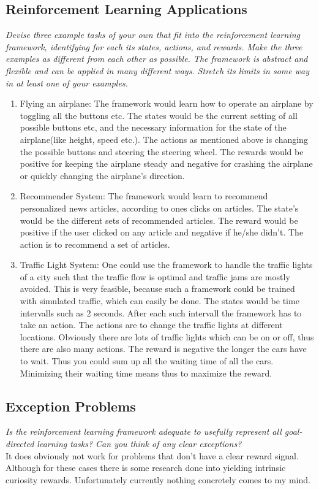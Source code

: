 \documentclass[12pt,a4paper]{article}
\begin{document}
\subsection{Reinforcement Learning Applications}
\textit{Devise three example tasks of your own that fit into the reinforcement learning framework, identifying for each its states, actions, and rewards. Make the three examples as different from each other as possible. The framework is abstract and flexible and can be applied in many different ways. Stretch its limits in some way in at least one of your examples.}\\

\begin{enumerate}
	\item Flying an airplane: The framework would learn how to operate an airplane by toggling all the buttons etc. The states would be the current setting of all possible buttons etc, and the necessary information for the state of the airplane(like height, speed etc.). The actions as mentioned above is changing the possible buttons and steering the steering wheel. The rewards would be positive for keeping the airplane steady and negative for crashing the airplane or quickly changing the airplane's direction. 
	\item Recommender System: The framework would learn to recommend personalized news articles, according to ones clicks on articles. The state's would be the different sets of recommended articles. The reward would be positive if the user clicked on any article and negative if he/she didn't. The action is to recommend a set of articles. 
	\item Traffic Light System: One could use the framework to handle the traffic lights of a city such that the traffic flow is optimal and traffic jams are mostly avoided. This is very feasible, because such a framework could be trained with simulated traffic, which can easily be done. The states would be time intervalls such as 2 seconds. After each such intervall the framework has to take an action. The actions are to change the traffic lights at different locations. Obviously there are lots of traffic lights which can be on or off, thus there are also many actions. The reward is negative the longer the cars have to wait. Thus you could sum up all the waiting time of all the cars. Minimizing their waiting time means thus to maximize the reward. 
\end{enumerate}

\subsection{Exception Problems}
\textit{Is the reinforcement learning framework adequate to usefully represent all goal-directed learning tasks? Can you think of any clear exceptions?}\\
It does obviously not work for problems that don't have a clear reward signal. Although for these cases there is some research done into yielding intrinsic curiosity rewards. Unfortunately currently nothing concretely comes to my mind.
\end{document}
